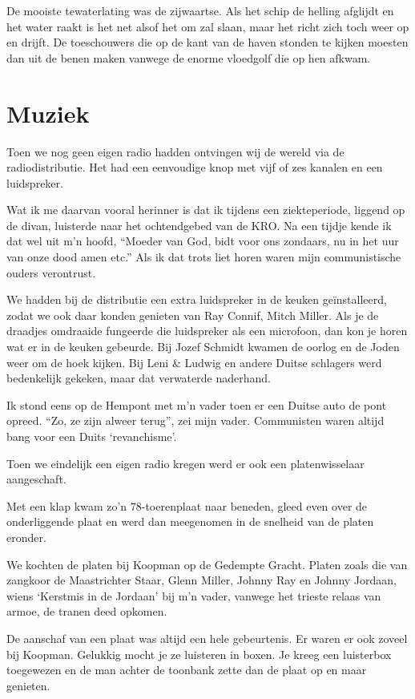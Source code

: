 \documentclass[10pt,twoside,openright]{memoir}
\begin{document}
De mooiste tewaterlating was de zijwaartse. Als het schip de helling afglijdt en het water raakt is het net alsof het om zal slaan, maar het richt zich toch weer op en drijft. De toeschouwers die op de kant van de haven stonden te kijken moesten dan uit de benen maken vanwege de enorme vloedgolf die op hen afkwam.

\chapter{Muziek} %
\label{cha:muziek}

Toen we nog geen eigen radio hadden ontvingen wij de wereld via de radiodistributie. Het had een eenvoudige knop met vijf of zes kanalen en een luidspreker. 

Wat ik me daarvan vooral herinner is dat ik tijdens een ziekteperiode, liggend op de divan, luisterde naar het ochtendgebed van de KRO. Na een tijdje kende ik dat wel uit m’n hoofd, ``Moeder van God, bidt voor ons zondaars, nu in het uur van onze dood amen etc.'' Als ik dat trots liet horen waren mijn communistische ouders verontrust. 

We hadden bij de distributie een extra luidspreker in de keuken geïnstalleerd, zodat we ook daar konden genieten van Ray Connif, Mitch Miller. Als je de draadjes omdraaide fungeerde die luidspreker als een microfoon, dan kon je horen wat er in de keuken gebeurde. Bij Jozef Schmidt kwamen de oorlog en de Joden weer om de hoek kijken. Bij Leni \& Ludwig en andere Duitse schlagers werd bedenkelijk gekeken, maar dat verwaterde naderhand. 

Ik stond eens op de Hempont met m’n vader toen er een Duitse auto de pont opreed. ``Zo, ze zijn alweer terug'', zei mijn vader. Communisten waren altijd bang voor een Duits `revanchisme’.

Toen we eindelijk een eigen radio kregen werd er ook een platenwisselaar aangeschaft. 

Met een klap kwam zo’n 78-toerenplaat naar beneden, gleed even over de onderliggende plaat en werd dan meegenomen in de snelheid van de platen eronder. 

We kochten de platen bij Koopman op de Gedempte Gracht. Platen zoals die van zangkoor de Maastrichter Staar, Glenn Miller, Johnny Ray en Johnny Jordaan, wiens `Kerstmis in de Jordaan’ bij m’n vader, vanwege het trieste relaas van armoe, de tranen deed opkomen.

De aanschaf van een plaat was altijd een hele gebeurtenis. Er waren er ook zoveel bij Koopman. Gelukkig mocht je ze luisteren in boxen. Je kreeg een luisterbox toegewezen en de man achter de toonbank zette dan de plaat op en maar genieten. 
\end{document}
